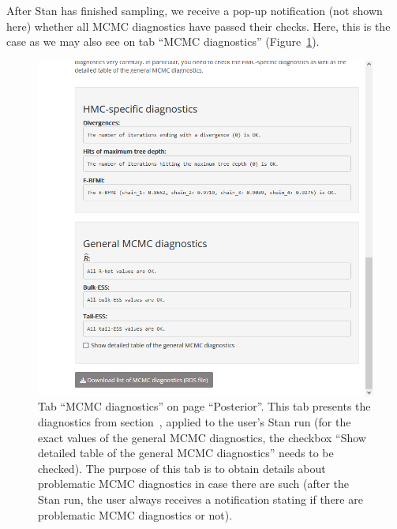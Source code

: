 After Stan has finished sampling, we receive a pop-up notification (not
shown here) whether all MCMC diagnostics have passed their checks. Here, this
is the case as we may also see on tab ``MCMC diagnostics''
(Figure~\ref{fig:post-MCMC}).
\begin{figure}[t!]
  \centering
  \includegraphics[width=\textwidth]{Figures/Posterior_Diagnostics.png}
  \caption[Tab ``MCMC diagnostics'']{Tab ``MCMC diagnostics'' on page ``Posterior''.
  This tab presents the diagnostics from section~, applied to
  the user's Stan run (for the exact values of the general MCMC diagnostics, the
  checkbox ``Show detailed table of the general MCMC diagnostics'' needs to be
  checked). The purpose of this tab is to obtain details about problematic
  MCMC diagnostics in case there are such (after the Stan run, the user always
  receives a notification stating if there are problematic MCMC diagnostics or not).}
  \label{fig:post-MCMC}
\end{figure}%

